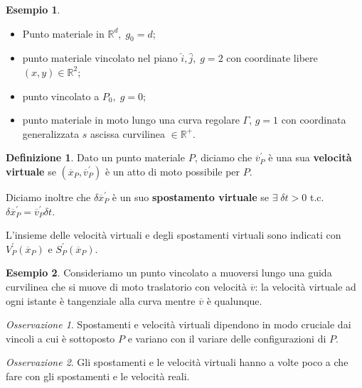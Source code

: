 \documentclass{book}
\theoremstyle{plain}
\theoremstyle{plain}
\theoremstyle{plain}
\theoremstyle{plain}
\theoremstyle{plain}
\theoremstyle{definition}
\newtheorem{defi}{Definizione}[chapter]
\theoremstyle{remark}
\newtheorem*{oss}{Osservazione}
\theoremstyle{definition}
\newtheorem*{ex}{Esempio}
\begin{document}
\begin{ex}

    \noindent 
    \begin{itemize}
        \item Punto materiale in $\mathbb{R}^d, \; g_0=d$;
        \item punto materiale vincolato nel piano $\hat{i},\hat{j}, \; g=2$ con coordinate libere $(x, y)\in\mathbb{R}^2$;
        \item punto vincolato a $P_0, \; g=0$;
        \item punto materiale in moto lungo una curva regolare $\Gamma,\,g=1$ con coordinata generalizzata $s$ ascissa curvilinea $\in \mathbb{R}^+$.
    \end{itemize}
\end{ex}

\begin{defi}
    Dato un punto materiale $P$, diciamo che $\overline{v}_{P}^{\prime}$ è una sua \textbf{velocità virtuale} se $\left(\overline{x}_{P}, \overline{v}_{P}^{\prime}\right)$ è un atto di moto possibile per $P$.
    
    \noindent Diciamo inoltre che $\delta \overline{x}_{P}^{\prime}$ è un suo \textbf{spostamento virtuale} se $\exists \; \delta t>0$ t.c. $\delta\overline{x}_{P}^{\prime}=\overline{v}_{P}^{\prime} \delta t$.
    
    \noindent L'insieme delle velocità virtuali e degli spostamenti virtuali sono indicati con $V_{P}^{\prime}\left(\overline{x}_{P}\right)$ e $S_{P}^{\prime}\left(\overline{x}_{P}\right)$.
\end{defi}

\begin{ex}
    Consideriamo un punto vincolato a muoversi lungo una guida curvilinea che si muove di moto traslatorio con velocità $\overline{v}$: la velocità virtuale ad ogni istante è tangenziale alla curva mentre $\overline{v}$ è qualunque.
\end{ex}

\begin{oss}
    Spostamenti e velocità virtuali dipendono in modo cruciale dai vincoli a cui è sottoposto $P$ e variano con il variare delle configurazioni di $P$.
\end{oss}

\begin{oss}
    Gli spostamenti e le velocità virtuali hanno a volte poco a che fare con gli spostamenti e le velocità reali.
\end{oss}
\end{document}
